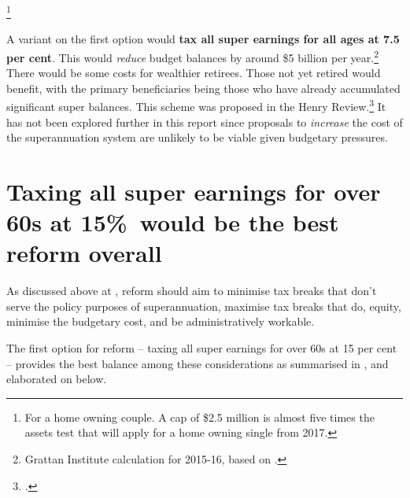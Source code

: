 \begin{enumerate}
\footnote{For a home owning couple. A cap of \$2.5 million is almost five times the assets test that will apply for a home owning single from 2017.}  
\end{enumerate}

A variant on the first option would \textbf{tax all super earnings for all ages at 7.5 per cent}. This would \emph{reduce} budget balances by around \$5 billion per year.\footnote{Grattan Institute calculation for 2015-16, based on \textcite{Treasury2010SuperAdditionalMaterial}.}  There would be some costs for wealthier retirees. Those not yet retired would benefit, with the primary beneficiaries being those who have already accumulated significant super balances. This scheme was proposed in the Henry Review.\footcite[][36]{HenryTaxReview2010}  It has not been explored further in this report since proposals to \emph{increase} the cost of the superannuation system are unlikely to be viable given budgetary pressures.

\section{Taxing all super earnings for over 60s at 15\%\ would be the best reform overall}\label{sec:SUPER-6-4}
As discussed above at , reform should aim to minimise tax breaks that don’t serve the policy purposes of superannuation, maximise tax breaks that do, equity, minimise the budgetary cost, and be administratively workable.

The first option for reform – taxing all super earnings for over 60s at 15 per cent – provides the best balance among these considerations as summarised in , and elaborated on below.

